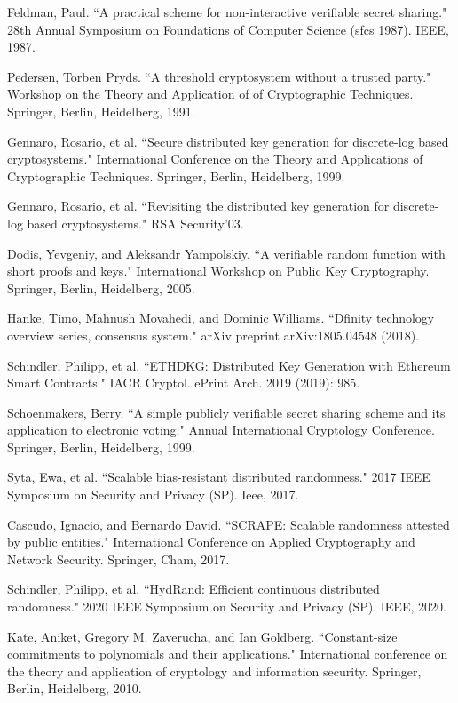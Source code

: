 \documentclass[11pt]{article}
\theoremstyle{definition}
\theoremstyle{remark}
\begin{document}
\newpage
\begin{thebibliography}{100}
Feldman, Paul. ``A practical scheme for non-interactive verifiable secret sharing." 28th Annual Symposium on Foundations of Computer Science (sfcs 1987). IEEE, 1987.

Pedersen, Torben Pryds. ``A threshold cryptosystem without a trusted party." Workshop on the Theory and Application of of Cryptographic Techniques. Springer, Berlin, Heidelberg, 1991.

Gennaro, Rosario, et al. ``Secure distributed key generation for discrete-log based cryptosystems." International Conference on the Theory and Applications of Cryptographic Techniques. Springer, Berlin, Heidelberg, 1999.

Gennaro, Rosario, et al. ``Revisiting the distributed key generation for discrete-log based cryptosystems." RSA Security'03.

Dodis, Yevgeniy, and Aleksandr Yampolskiy. ``A verifiable random function with short proofs and keys." International Workshop on Public Key Cryptography. Springer, Berlin, Heidelberg, 2005.

Hanke, Timo, Mahnush Movahedi, and Dominic Williams. ``Dfinity technology overview series, consensus system." arXiv preprint arXiv:1805.04548 (2018).

Schindler, Philipp, et al. ``ETHDKG: Distributed Key Generation with Ethereum Smart Contracts." IACR Cryptol. ePrint Arch. 2019 (2019): 985.

Schoenmakers, Berry. ``A simple publicly verifiable secret sharing scheme and its application to electronic voting." Annual International Cryptology Conference. Springer, Berlin, Heidelberg, 1999.

Syta, Ewa, et al. ``Scalable bias-resistant distributed randomness." 2017 IEEE Symposium on Security and Privacy (SP). Ieee, 2017.

Cascudo, Ignacio, and Bernardo David. ``SCRAPE: Scalable randomness attested by public entities." International Conference on Applied Cryptography and Network Security. Springer, Cham, 2017.

Schindler, Philipp, et al. ``HydRand: Efficient continuous distributed randomness." 2020 IEEE Symposium on Security and Privacy (SP). IEEE, 2020.

Kate, Aniket, Gregory M. Zaverucha, and Ian Goldberg. ``Constant-size commitments to polynomials and their applications." International conference on the theory and application of cryptology and information security. Springer, Berlin, Heidelberg, 2010.


\end{thebibliography}
\end{document}
